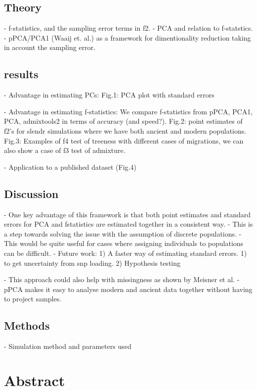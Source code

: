 \documentclass[12pt, letterpaper]{article}
\begin{document}
\subsection{Theory}
- f-statistics, and the sampling error terms in f2.
- PCA and relation to f-statstics.
- pPCA/PCA1 (Waaij et. al.) as a framework for dimentionality reduction taking in account the sampling error.

\subsection{results}
- Advantage in estimating PCs: Fig.1: PCA plot with standard errors

- Advantage in estimating f-statistics: We compare f-statistics from pPCA, PCA1, PCA, admixtools2 in terms of accuracy (and speed?). Fig.2: point estimates of f2's for slendr simulations where we have both ancient and modern populations. Fig.3: Examples of f4 test of treeness with different cases of migrations, we can also show a case of f3 test of admixture.

- Application to a published dataset (Fig.4)

\subsection{Discussion}
- One key advantage of this framework is that both point estimates and standard errors for PCA and fstatistics are estimated together in a consistent way.
- This is a step towards solving the issue with the assumption of discrete populations.
- This would be quite useful for cases where assigning individuals to populations can be difficult.
- Future work: 1) A faster way of estimating standard errors. 1) to get uncertainty from snp loading. 2) Hypothesis testing 

- This approach could also help with missingness as shown by Meisner et al. 
- pPCA makes it easy to analyse modern and ancient data together without having to project samples.

\subsection{Methods}
- Simulation method and parameters used


\section{Abstract}
\end{document}
